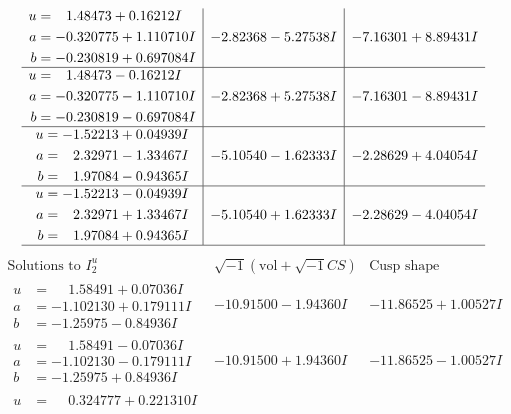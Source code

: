 \documentclass[1p]{elsarticle_modified}
\theoremstyle{definition}
\newcommand{\I}{\sqrt{-1}}
\begin{document}
$$\begin{array}{c|c|c}
\begin{aligned}
u &= \phantom{-}1.48473 + 0.16212 I \\
a &= -0.320775 + 1.110710 I \\
b &= -0.230819 + 0.697084 I\end{aligned}
 & -2.82368 - 5.27538 I & -7.16301 + 8.89431 I \\ \hline\begin{aligned}
u &= \phantom{-}1.48473 - 0.16212 I \\
a &= -0.320775 - 1.110710 I \\
b &= -0.230819 - 0.697084 I\end{aligned}
 & -2.82368 + 5.27538 I & -7.16301 - 8.89431 I \\ \hline\begin{aligned}
u &= -1.52213 + 0.04939 I \\
a &= \phantom{-}2.32971 - 1.33467 I \\
b &= \phantom{-}1.97084 - 0.94365 I\end{aligned}
 & -5.10540 - 1.62333 I & -2.28629 + 4.04054 I \\ \hline\begin{aligned}
u &= -1.52213 - 0.04939 I \\
a &= \phantom{-}2.32971 + 1.33467 I \\
b &= \phantom{-}1.97084 + 0.94365 I\end{aligned}
 & -5.10540 + 1.62333 I & -2.28629 - 4.04054 I\\
 \hline 
 \end{array}$$\newpage$$\begin{array}{c|c|c}  
\text{Solutions to }I^u_{2}& \I (\text{vol} + \sqrt{-1}CS) & \text{Cusp shape}\\
 \hline 
\begin{aligned}
u &= \phantom{-}1.58491 + 0.07036 I \\
a &= -1.102130 + 0.179111 I \\
b &= -1.25975 - 0.84936 I\end{aligned}
 & -10.91500 - 1.94360 I & -11.86525 + 1.00527 I \\ \hline\begin{aligned}
u &= \phantom{-}1.58491 - 0.07036 I \\
a &= -1.102130 - 0.179111 I \\
b &= -1.25975 + 0.84936 I\end{aligned}
 & -10.91500 + 1.94360 I & -11.86525 - 1.00527 I \\ \hline\begin{aligned}
u &= \phantom{-}0.324777 + 0.221310 I \\

\end{aligned}
\end{array}$$
\end{document}
